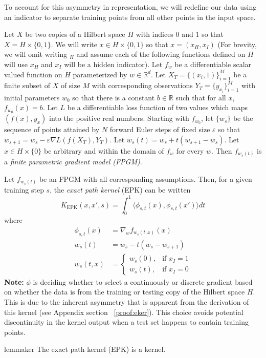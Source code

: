 To account for this asymmetry in representation, we will redefine our data using an indicator to separate training points from all other points in the input space.
\begin{definition}
\label{fpm}
Let $X$ be two copies of a Hilbert space $H$ with indices $0$ and $1$ so that $X = H \times \{0,1\}$. We will write $x \in H \times \{0,1\}$ so that $x = (x_H, x_I)$ (For brevity, we will omit writing $_H$ and assume each of the following functions defined on $H$ will use $x_H$ and $x_I$ will be a hidden indicator).
Let $ f_{w}$ be a differentiable scalar valued function on $H$ parameterized by $w \in \mathbb{R}^d$. Let $X_T = \{(x_i, 1)\}_{i=1}^M$ be a finite subset of $X$ of size $M$ with corresponding observations $Y_T = \{y_{x_i}\}_{i=1}^M$ with initial parameters $w_0$ so that there is a constant $b \in \mathbb{R}$ such that for all $x$, $ f_{w_0}(x) = b$. Let $L$ be a differentiable loss function of two values which maps $(f(x), y_x)$ into the positive real numbers. Starting with $f_{w_0}$, let $\{w_s\}$ be the sequence of points attained by $N$ forward Euler steps of fixed size $\varepsilon$ so that $w_{s+1} = w_{s} - \varepsilon \nabla L(f(X_T), Y_T)$. Let $w_s(t) = w_s + t(w_{s+1}-w_s)$. Let $x \in H \times \{0\}$ be arbitrary and within the domain of $f_w$ for every $w$. Then $f_{w_s(t)}$ is a \emph{finite parametric gradient model (FPGM)}. 
\end{definition}

\begin{definition}
\label{epk}

Let $f_{w_s(t)}$ be an FPGM with all corresponding assumptions. Then, for a given training step $s$, the \emph{exact path kernel} (EPK) can be written  
\begin{equation}
 K_{\text{EPK}}(x, x', s) = \int_0^1\langle \phi_{s,t}(x), \phi_{s,t}(x')\rangle dt
 \label{eq2}
\end{equation}
where
\begin{align}
\phi_{s, t}(x) &=  \nabla_w f_{w_s(t,x)} (x)\\
w_s(t) &= w_s - t(w_s - w_{s+1})\\
w_s(t,x) &= \begin{cases} w_s(0), & \text{if } x_I = 1\\ w_s(t), & \text{if } x_I = 0 \end{cases}
\end{align}
\textbf{Note:} $\phi$ is deciding whether to select a continuously or
discrete gradient based on whether the data is from the training or
testing copy of the Hilbert space $H$. This is due to the inherent
asymmetry that is apparent from the derivation of this kernel (see
Appendix section ~\ref{proof:eker}). This choice avoids potential discontinuity in the kernel output when a test set happens to contain training points. 
\end{definition}
\begin{restatable}{lemma}{ker}
The exact path kernel (EPK) is a kernel.
\end{restatable}

